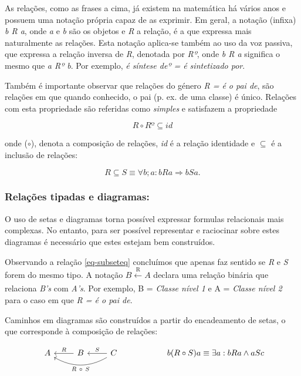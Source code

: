 \documentclass[tikz,runningheads,a4paper]{llncs}
\begin{document}
As relações, como as frases a cima, já existem na matemática há vários anos e possuem uma notação própria capaz de as exprimir. Em geral, a notação (infixa) \textit{b R a}, onde \textit{a} e \textit{b} são os objetos e \textit{R} a relação, é a que expressa mais naturalmente as relações. Esta notação aplica-se também ao uso da voz passiva, que expressa a relação inversa de \textit{R}, denotada por \textit{Rº}, onde \textit{b R a} significa o mesmo que \textit{a Rº b}. Por exemplo, \textit{é síntese deº = é sintetizado por}.\label{rel_inv}

Também é importante observar que relações do género \textit{R = é o pai de}, são relações em que quando conhecido, o pai (p. ex. de uma classe) é único. Relações com esta propriedade são referidas como \textit{simples} e satisfazem a propriedade

\begin{equation}
\label{eq-simple}
R \circ Rº \subseteq id
\end{equation}

\noindent onde ($\circ$), denota a composição de relações, \textit{id} é a relação identidade e $\subseteq$ é a inclusão de relações:

\begin{equation}
\label{eq-subseteq}
R \subseteq S \equiv \forall b; a : b R a \Rightarrow b S a.
\end{equation}

\subsubsection{Relações tipadas e diagramas:}

O uso de setas e diagramas torna possível expressar formulas relacionais mais complexas. No entanto, para ser possível representar e raciocinar sobre estes diagramas é necessário que estes estejam bem construídos.

Observando a relação \eqref{eq-subseteq} concluímos que apenas faz sentido se \textit{R} e \textit{S} forem do mesmo tipo. A notação $B \xleftarrow[]{\text{R}} A$ declara uma relação binária que relaciona \textit{B's} com \textit{A's}. Por exemplo, B = \textit{Classe nível 1} e A = \textit{Classe nível 2} para o caso em que \textit{R = é o pai de}. 

Caminhos em diagramas são construídos a partir do encadeamento de setas, o que corresponde à composição de relações:

\begin{equation}
\label{eq-composition}
\begin{tikzcd}
A \arrow[bend right, leftarrow, swap]{rr}{R\ \circ\ S} \arrow[leftarrow]{r}{R} & B \arrow[leftarrow]{r}{S} & C
\end{tikzcd}
\hskip2cm b (R \circ S) a \equiv \exists a: b R a \land a S c
\end{equation}
\end{document}
